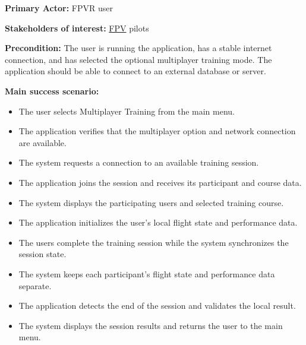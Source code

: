 \documentclass[12pt]{article}
\begin{document}
\begin{description}
\textbf{Primary Actor:} FPVR user

\textbf{Stakeholders of interest:} \hyperlink{glos:FPV}{FPV} pilots

\textbf{Precondition:} The user is running the application, has a stable internet
connection, and has selected the optional multiplayer training mode. The application
should be able to connect to an external database or server.

\textbf{Main success scenario:}
\begin{itemize}
\item The user selects Multiplayer Training from the main menu.
\item The application verifies that the multiplayer option and network connection are
available.
\item The system requests a connection to an available training session.
\item The application joins the session and receives its participant and course data.
\item The system displays the participating users and selected training course.
\item The application initializes the user's local flight state and performance data.
\item The users complete the training session while the system synchronizes the
session state.
\item The system keeps each participant's flight state and performance data
separate.
\item The application detects the end of the session and validates the local result.
\item The system displays the session results and returns the user to the main menu.
\end{itemize}


\end{description}
\end{document}
